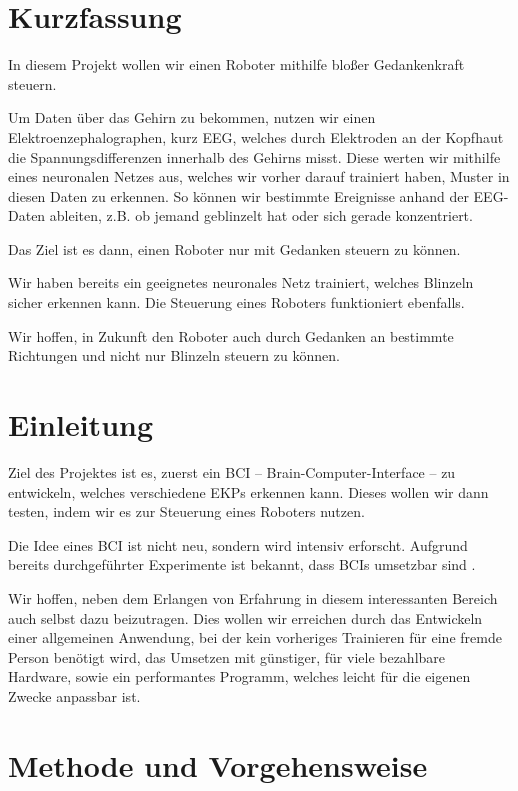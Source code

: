\documentclass{scrartcl}
\begin{document}
	\newpage

	\section{Kurzfassung}


	In diesem Projekt wollen wir einen Roboter mithilfe bloßer Gedankenkraft steuern.

	Um Daten über das Gehirn zu bekommen, nutzen wir einen Elektroenzephalographen, kurz EEG, welches durch Elektroden an der Kopfhaut die Spannungsdifferenzen innerhalb des Gehirns misst. Diese werten wir mithilfe eines neuronalen Netzes aus, welches wir vorher darauf trainiert haben, Muster in diesen Daten zu erkennen. So können wir bestimmte Ereignisse anhand der EEG-Daten ableiten, z.B. ob jemand geblinzelt hat oder sich gerade konzentriert.
	
	Das Ziel ist es dann, einen Roboter nur mit Gedanken steuern zu können.
	
	Wir haben bereits ein geeignetes neuronales Netz trainiert, welches Blinzeln sicher erkennen kann. Die Steuerung eines Roboters funktioniert ebenfalls.
	
	Wir hoffen, in Zukunft den Roboter auch durch Gedanken an bestimmte Richtungen und nicht nur Blinzeln steuern zu können.

	\section{Einleitung}

	Ziel des Projektes ist es, zuerst ein BCI -- Brain-Computer-Interface -- zu entwickeln, welches verschiedene EKPs erkennen kann. Dieses wollen wir dann testen, indem wir es zur Steuerung eines Roboters nutzen.

	Die Idee eines BCI ist nicht neu, sondern wird intensiv erforscht. Aufgrund bereits durchgeführter Experimente ist bekannt, dass BCIs umsetzbar sind \cite{BCIChaudhary}.
	
	Wir hoffen, neben dem Erlangen von Erfahrung in diesem interessanten Bereich auch selbst dazu beizutragen. Dies wollen wir erreichen durch das Entwickeln einer allgemeinen Anwendung, bei der kein vorheriges Trainieren für eine fremde Person benötigt wird, das Umsetzen mit günstiger, für viele bezahlbare Hardware, sowie ein performantes Programm, welches leicht für die eigenen Zwecke anpassbar ist.

	\section{Methode und Vorgehensweise}
\end{document}
